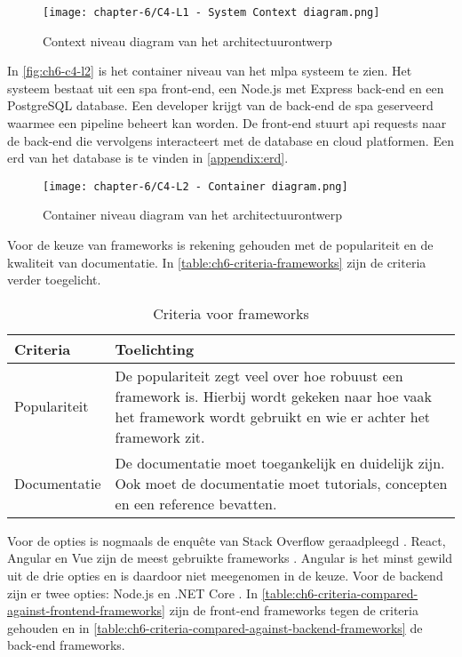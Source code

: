 \begin{figure}[hbt!]
  \centering
  \texttt{[image: chapter-6/C4-L1 - System Context diagram.png]}
  \caption{Context niveau diagram van het architectuurontwerp}
  \label{fig:ch6-c4-l1}
\end{figure}

In \autoref{fig:ch6-c4-l2} is het container niveau van het \Acrshort{mlpa} systeem te zien. Het systeem bestaat uit een \acrfull{spa} front-end, een Node.js met Express back-end en een PostgreSQL database. Een developer krijgt van de back-end de \Acrshort{spa} geserveerd waarmee een pipeline beheert kan worden. De front-end stuurt \Acrshort{api} requests naar de back-end die vervolgens interacteert met de database en cloud platformen. Een \acrfull{erd} van het database is te vinden in \ref{appendix:erd}.

\newpage

\begin{figure}[hbt!]
  \centering
  \texttt{[image: chapter-6/C4-L2 - Container diagram.png]}
  \caption{Container niveau diagram van het architectuurontwerp}
  \label{fig:ch6-c4-l2}
\end{figure}

Voor de keuze van frameworks is rekening gehouden met de populariteit en de  kwaliteit van documentatie. In \autoref{table:ch6-criteria-frameworks} zijn de criteria verder toegelicht.

\begin{table}[hbt!]
  \centering
  \caption{Criteria voor frameworks}
  \vspace*{.5\baselineskip}
  \begin{tabular}{|p{.15\linewidth}|p{.85\linewidth}|}
  \hline
  \textbf{Criteria} & \textbf{Toelichting} \\ \hline
    Populariteit
    &
    De populariteit zegt veel over hoe robuust een framework is. Hierbij wordt gekeken naar hoe vaak het framework wordt gebruikt en wie er achter het framework zit.
    \\ \hline

    Documentatie
    &
    De documentatie moet toegankelijk en duidelijk zijn. Ook moet de documentatie moet tutorials, concepten en een reference bevatten.
    \\ \hline
  \end{tabular}
  \label{table:ch6-criteria-frameworks}
\end{table}

Voor de opties is nogmaals de enquête van Stack Overflow geraadpleegd \cite{stack-overflow-survey-2020}. React, Angular en Vue zijn de meest gebruikte frameworks \cite{stack-overflow-survey-2020-technology-web-frameworks}. Angular is het minst gewild uit de drie opties \cite{stack-overflow-survey-2020-technology-most-loved-dreaded-and-wanted-languages} en is daardoor niet meegenomen in de keuze. Voor de backend zijn er twee opties: Node.js en .NET Core \cite{stack-overflow-survey-2020-popular-framework-libraries-tools}. In \autoref{table:ch6-criteria-compared-against-frontend-frameworks} zijn de front-end frameworks tegen de criteria gehouden en in \autoref{table:ch6-criteria-compared-against-backend-frameworks} de back-end frameworks.

